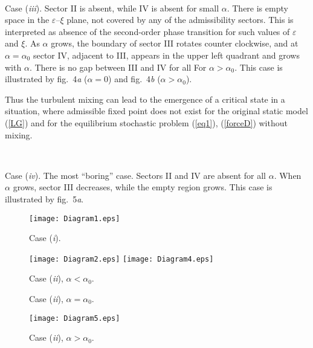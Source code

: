 \documentclass[12pt]{iopart}
\begin{document}
\

Case ({\it iii}). Sector II is absent, while IV is absent for small $\alpha$.
There is empty space in the $\varepsilon$--$\xi$ plane, not covered
by any of the admissibility sectors. This is interpreted as absence of
the second-order phase transition for such values of $\varepsilon$ and $\xi$.
As $\alpha$ grows, the boundary of sector III rotates counter clockwise, and
at $\alpha=\alpha_{0}$ sector IV, adjacent to III, appears in the upper
left quadrant and grows with $\alpha$. There is no gap between III and IV
for all For $\alpha>\alpha_{0}$. This case is illustrated by fig.~4{\it a}
($\alpha=0$) and fig.~4{\it b} ($\alpha>\alpha_{0}$).

Thus the turbulent mixing can lead to the emergence of a critical state
in a situation, where admissible fixed point does not exist for the original
static model (\ref{LG}) and for the equilibrium stochastic problem
(\ref{eq1}), (\ref{forceD}) without mixing.

\

Case ({\it iv}). The most ``boring'' case. Sectors II and IV are absent
for all $\alpha$. When $\alpha$ grows, sector III decreases, while the
empty region grows. This case is illustrated by fig.~5{\it a}.



\begin{figure}
\begin{center}
\texttt{[image: Diagram1.eps]}
\caption{ Case ({\it i}).}
\label{fig1}
\end{center}
\end{figure}

\begin{figure}
\texttt{[image: Diagram2.eps]}
{}\hfill{}
\texttt{[image: Diagram4.eps]}
\parbox[t]{0.45\textwidth}{\caption{Case ({\it ii}), $\alpha<\alpha_{0}$.}
\label{fig3}}
{}\hfill{}
\parbox[t]{0.45\textwidth}{\caption{Case ({\it ii}), $\alpha=\alpha_{0}$.}
\label{fig4}}
\end{figure}


\begin{figure}
\begin{center}
\texttt{[image: Diagram5.eps]}
\caption{Case ({\it ii}), $\alpha>\alpha_{0}$.}
\label{fig5}
\end{center}
\end{figure}
\end{document}
